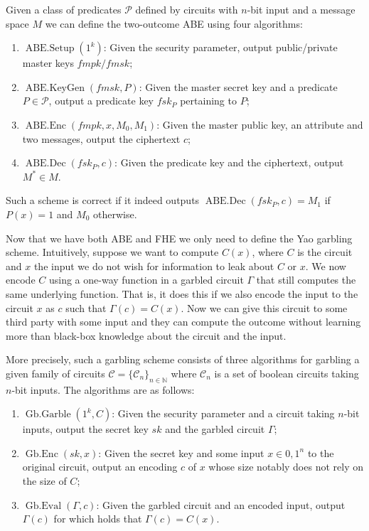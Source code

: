 \documentclass[11pt, a4paper]{article}
\newcommand{\op}[1]{\operatorname{#1}}
\begin{document}
Given a class of predicates $\mathcal{P}$ defined by circuits with $n$-bit input and a message space $M$ we can define the two-outcome ABE using four algorithms:
\begin{enumerate}
    \item $\op{ABE.Setup}(1^k)$: Given the security parameter, output public/private master keys $fmpk/fmsk$;
    \item $\op{ABE.KeyGen}(fmsk, P)$: Given the master secret key and a predicate $P \in \mathcal{P}$, output a predicate key $fsk_P$ pertaining to $P$;
    \item $\op{ABE.Enc}(fmpk, x, M_0, M_1)$: Given the master public key, an attribute and two messages, output the ciphertext $c$;
    \item $\op{ABE.Dec}(fsk_P, c)$: Given the predicate key and the ciphertext, output $M^* \in M$.
\end{enumerate}
Such a scheme is correct if it indeed outputs $\op{ABE.Dec}(fsk_P, c) = M_1$ if $P(x) = 1$ and $M_0$ otherwise.

Now that we have both ABE and FHE we only need to define the Yao garbling scheme. 
Intuitively, suppose we want to compute $C(x)$, where $C$ is the circuit and $x$ the input we do not wish for information to leak about $C$ or $x$.
We now encode $C$ using a one-way function in a garbled circuit $\Gamma$ that still computes the same underlying function.
That is, it does this if we also encode the input to the circuit $x$ as $c$ such that $\Gamma(c) = C(x)$.
Now we can give this circuit to some third party with some input and they can compute the outcome without learning more than black-box knowledge about the circuit and the input.

More precisely, such a garbling scheme consists of three algorithms for garbling a given family of circuits $\mathcal{C} = \{\mathcal{C}_n\}_{n\in\mathbb{N}}$ where $\mathcal{C}_n$ is a set of boolean circuits taking $n$-bit inputs. The algorithms are as follows:
\begin{enumerate}
    \item $\op{Gb.Garble}(1^k, C)$: Given the security parameter and a circuit taking $n$-bit inputs, output the secret key $sk$ and the garbled circuit $\Gamma$;
    \item $\op{Gb.Enc}(sk, x)$: Given the secret key and some input $x \in {0,1}^n$ to the original circuit, output an encoding $c$ of $x$ whose size notably does not rely on the size of $C$;
    \item $\op{Gb.Eval}(\Gamma, c)$: Given the garbled circuit and an encoded input, output $\Gamma(c)$ for which holds that $\Gamma(c) = C(x)$.
\end{enumerate}
\end{document}
